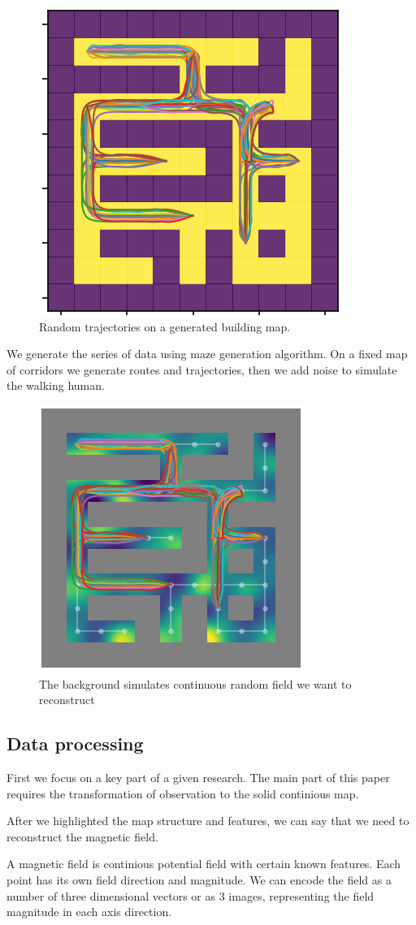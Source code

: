 \begin{figure}
	\centering
	\includegraphics[width=0.4\linewidth]{images/routes2}
	\caption{Random trajectories on a generated building map.}
	\label{fig:routes1}
\end{figure}

We generate the series of data using maze generation algorithm. On a fixed map of corridors we generate routes and trajectories, then we add noise to simulate the walking human.

\begin{figure}
	\centering
	\includegraphics[width=0.4\linewidth]{images/routes3}
	\caption{The background simulates continuous random field we want to reconstruct}
	\label{fig:routes3}
\end{figure}

\subsection{Data processing}

First we focus on a key part of a given research. The main part of this paper requires the transformation of observation to the solid continious map.

After we highlighted the map structure and features, we can say that we need to reconstruct the magnetic field.

A magnetic field is continious potential field with certain known features. Each point has its own field direction and magnitude.
We can encode the field as a number of three dimensional vectors or as 3 images, representing the field magnitude in each axis direction.

